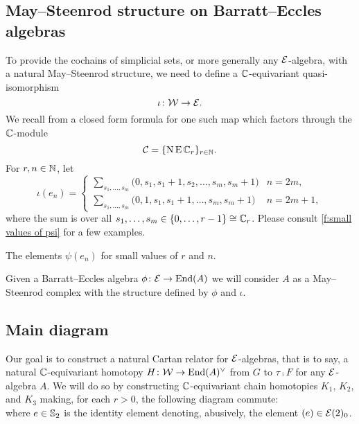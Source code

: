 \subsection{May--Steenrod structure on Barratt--Eccles algebras}\label{ss:may-steenrod on barratt-eccles}

To provide the cochains of simplicial sets, or more generally any $\mathcal{E}$-algebra, with a natural May--Steenrod structure, we need to define a $\mathbb{C}$-equivariant quasi-isomorphism
\[
\iota \colon \mathcal{W} \to \mathcal{E}.
\]
We recall from \cite{medina2021may_st} a closed form formula for one such map which factors through the $\mathbb{C}$-module
\[
\mathcal{C} = \{\operatorname{N}\operatorname{E}\mathbb{C}_r\}_{r\in\mathbb{N}}.
\]
For $r,n\in\mathbb{N}$, let
\begin{equation*}
	\iota(e_{n}) =
	\begin{cases}
		\displaystyle{\sum_{s_1, \dots, s_m}} \big(0, {s_1}, {s_1+1}, {s_2}, \dots, {s_{m}}, {s_{m}+1} \big) & n = 2m, \\
		\displaystyle{\sum_{s_1, \dots, s_m}} \big(0, 1, {s_1}, {s_1+1}, \dots, {s_{m}}, {s_{m}+1} \big) & n = 2m+1,
	\end{cases}
\end{equation*}
where the sum is over all $s_1, \dots, s_m \in \{0, \dots, r-1\} \cong \mathbb{C}_r$.
Please consult \cref{f:small values of psi} for a few examples.

\begin{table}
	\centering
	
	\caption{The elements $\psi(e_n)$ for small values of $r$ and $n$.}
	\label{f:small values of psi}
\end{table}

Given a Barratt--Eccles algebra $\phi \colon \mathcal{E} \to \mathrm{End}(A)$ we will consider $A$ as a May--Steenrod complex with the structure defined by $\phi$ and $\iota$.

\subsection{Main diagram}

Our goal is to construct a natural Cartan relator for $\mathcal{E}$-algebras, that is to say, a natural $\mathbb{C}$-equivariant homotopy $H \colon \mathcal{W} \to \mathrm{End}(A)^\vee$ from $G$ to $\tau \comp F$ for any $\mathcal{E}$-algebra $A$.
We will do so by constructing $\mathbb{C}$-equivariant chain homotopies $K_1$, $K_2$, and $K_3$ making, for each $r>0$, the following diagram commute:
\begin{equation}\label{d:big diagram}
	
\end{equation}
where $e \in \mathbb{S}_2$ is the identity element denoting, abusively, the element $(e) \in \mathcal{E}(2)_0$.

